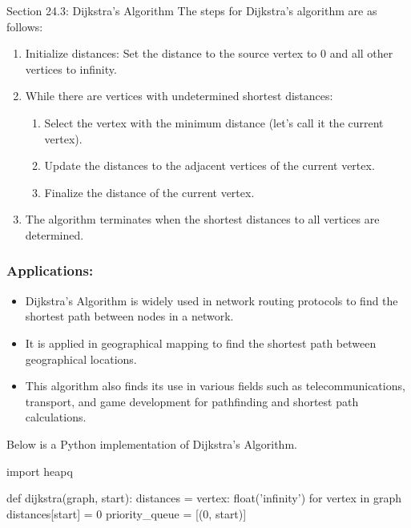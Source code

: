 \begin{notes}{Section 24.3: Dijkstra's Algorithm}
    The steps for Dijkstra's algorithm are as follows:
    \begin{enumerate}
        \item Initialize distances: Set the distance to the source vertex to 0 and all other vertices to infinity.
        \item While there are vertices with undetermined shortest distances:
            \begin{enumerate}
                \item Select the vertex with the minimum distance (let's call it the current vertex).
                \item Update the distances to the adjacent vertices of the current vertex.
                \item Finalize the distance of the current vertex.
            \end{enumerate}
        \item The algorithm terminates when the shortest distances to all vertices are determined.
    \end{enumerate}
    
    \subsubsection*{Applications:}
    
    \begin{itemize}
        \item Dijkstra's Algorithm is widely used in network routing protocols to find the shortest path between nodes in a network.
        \item It is applied in geographical mapping to find the shortest path between geographical locations.
        \item This algorithm also finds its use in various fields such as telecommunications, transport, and game development for pathfinding and shortest path calculations.
    \end{itemize}
    
    \begin{highlight}
    
    Below is a Python implementation of Dijkstra's Algorithm.
    
    \begin{code}[Python]
    import heapq
    
    def dijkstra(graph, start):
        distances = {vertex: float('infinity') for vertex in graph}
        distances[start] = 0
        priority_queue = [(0, start)]
    

\end{code}
\end{highlight}
\end{notes}
